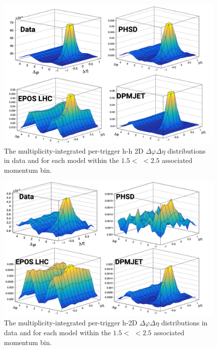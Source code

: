 \clearpage
\begin{figure}[ht]
\centering
\includegraphics[width=\textwidth]{figures/results/h_h_2d_modelcomp.png}
\caption{The multiplicity-integrated per-trigger h-h 2D $\Delta\varphi\Delta\eta$ distributions in data and for each model within the $1.5 <$ \pt $< 2.5$ \GeVc associated momentum bin.}
\label{fig:h_h_2d_model}
\end{figure}

\begin{figure}[ht]
\centering
\includegraphics[width=\textwidth]{figures/results/h_lambda_2d_modelcomp.png}
\caption{The multiplicity-integrated per-trigger h-\lmb 2D $\Delta\varphi\Delta\eta$ distributions in data and for each model within the $1.5 <$ \pt $< 2.5$ \GeVc associated momentum bin.}
\label{fig:h_lambda_2d_model}
\end{figure}
\clearpage


